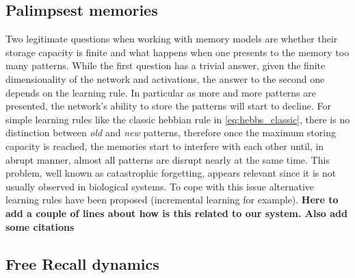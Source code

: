 \subsection{Palimpsest memories}
Two legitimate questions when working with memory models are whether their storage capacity is finite and what happens when one presents to the memory too many patterns. While the first question has a trivial answer, given the finite dimensionality of the network and activations, the answer to the second one depends on the learning rule. In particular as more and more patterns are presented, the network's ability to store the patterns will start to decline. For simple learning rules like the classic hebbian rule in \eqref{eq:hebbs_classic}, there is no distinction between \textit{old} and \textit{new} patterns, therefore once the maximum storing capacity is reached, the memories start to interfere with each other until, in abrupt manner, almost all patterns are disrupt nearly at the same time. This problem, well known as catastrophic forgetting, appears relevant since it is not usually observed in biological systems. To cope with this issue alternative learning rules have been proposed (incremental learning for example). \textbf{Here to add a couple of lines about how is this related to our system. Also add some citations}

\subsection{Free Recall dynamics}
